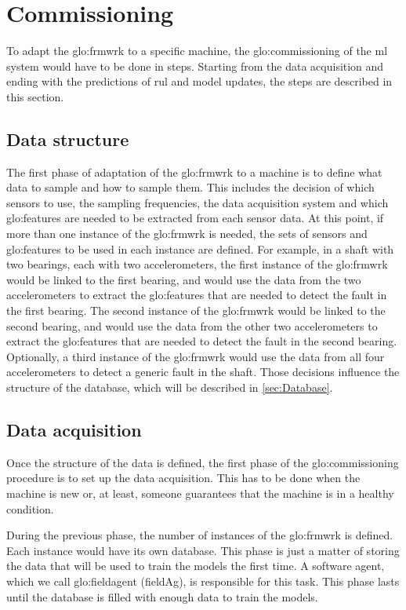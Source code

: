 \section{Commissioning}
\label{sec:commissioning}
To adapt the \gls{glo:frmwrk} to a specific machine, the \gls{glo:commissioning} of the \gls{ml} system would have to be done in steps. Starting from the data acquisition and ending with the predictions of \gls{rul} and model updates, the steps are described in this section.

\subsection{Data structure}
\label{sec:Data_structure}
The first phase of adaptation of the \gls{glo:frmwrk} to a machine is to define what data to sample and how to sample them. This includes the decision of which sensors to use, the sampling frequencies, the data acquisition system and which \gls{glo:feature}s are needed to be extracted from each sensor data. At this point, if more than one instance of the \gls{glo:frmwrk} is needed, the sets of sensors and \gls{glo:feature}s to be used in each instance are defined. For example, in a shaft with two bearings, each with two accelerometers, the first instance of the \gls{glo:frmwrk} would be linked to the first bearing, and would use the data from the two accelerometers to extract the \gls{glo:feature}s that are needed to detect the fault in the first bearing. The second instance of the \gls{glo:frmwrk} would be linked to the second bearing, and would use the data from the other two accelerometers to extract the \gls{glo:feature}s that are needed to detect the fault in the second bearing. Optionally, a third instance of the \gls{glo:frmwrk} would use the data from all four accelerometers to detect a generic fault in the shaft.
Those decisions influence the structure of the database, which will be described in \autoref{sec:Database}. 

\subsection{Data acquisition}
Once the structure of the data is defined, the first phase of the \gls{glo:commissioning} procedure is to set up the data acquisition. This has to be done when the machine is new or, at least, someone guarantees that the machine is in a healthy condition.

During the previous phase, the number of instances of the \gls{glo:frmwrk} is defined. Each instance would have its own database. This phase is just a matter of storing the data that will be used to train the models the first time. A software agent, which we call \gls{glo:fieldagent} (\gls{fieldAg}), is responsible for this task. 
This phase lasts until the database is filled with enough data to train the models.

